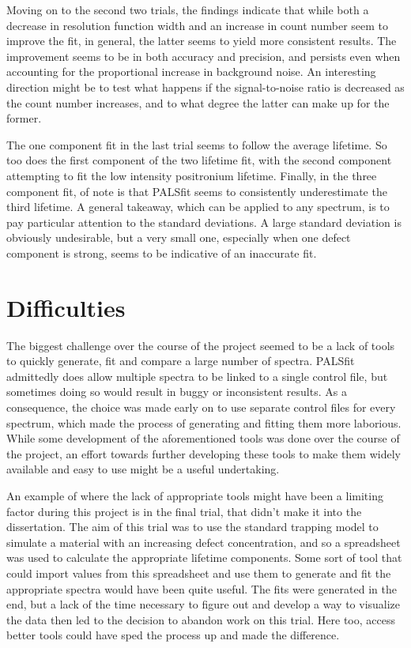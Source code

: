 Moving on to the second two trials, the findings indicate that while both a decrease in resolution function width and an increase in count number seem to improve the fit, in general, the latter seems to yield more consistent results. The improvement seems to be in both accuracy and precision, and persists even when accounting for the proportional increase in background noise. An interesting direction might be to test what happens if the signal-to-noise ratio is decreased as the count number increases, and to what degree the latter can make up for the former.

The one component fit in the last trial seems to follow the average lifetime. So too does the first component of the two lifetime fit, with the second component attempting to fit the low intensity positronium lifetime. Finally, in the three component fit, of note is that PALSfit seems to consistently underestimate the third lifetime. A general takeaway, which can be applied to any spectrum, is to pay particular attention to the standard deviations. A large standard deviation is obviously undesirable, but a very small one, especially when one defect component is strong, seems to be indicative of an inaccurate fit.

\section{Difficulties}

The biggest challenge over the course of the project seemed to be a lack of tools to quickly generate, fit and compare a large number of spectra. PALSfit admittedly does allow multiple spectra to be linked to a single control file, but sometimes doing so would result in buggy or inconsistent results. As a consequence, the choice was made early on to use separate control files for every spectrum, which made the process of generating and fitting them more laborious. While some development of the aforementioned tools was done over the course of the project, an effort towards further developing these tools to make them widely available and easy to use might be a useful undertaking. 

An example of where the lack of appropriate tools might have been a limiting factor during this project is in the final trial, that didn't make it into the dissertation. The aim of this trial was to use the standard trapping model to simulate a material with an increasing defect concentration, and so a spreadsheet was used to calculate the appropriate lifetime components. Some sort of tool that could import values from this spreadsheet and use them to generate and fit the appropriate spectra would have been quite useful. The fits were generated in the end, but a lack of the time necessary to figure out and develop a way to visualize the data then led to the decision to abandon work on this trial. Here too, access better tools could have sped the process up and made the difference.

